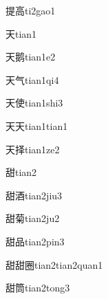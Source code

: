 \begin{verbete}[12;10]{提高}{ti2gao1}
\end{verbete}

\begin{verbete}[4]{天}{tian1}
\end{verbete}

\begin{verbete}[4;12]{天鹅}{tian1e2}
\end{verbete}

\begin{verbete}[4;4]{天气}{tian1qi4}
\end{verbete}

\begin{verbete}[4;8]{天使}{tian1shi3}
\end{verbete}

\begin{verbete}[4;4]{天天}{tian1tian1}
\end{verbete}

\begin{verbete}[4;8]{天择}{tian1ze2}
\end{verbete}

\begin{verbete}[11]{甜}{tian2}
\end{verbete}

\begin{verbete}[11;10]{甜酒}{tian2jiu3}
\end{verbete}

\begin{verbete}[11;11]{甜菊}{tian2ju2}
\end{verbete}

\begin{verbete}[11;9]{甜品}{tian2pin3}
\end{verbete}

\begin{verbete}[11;11;11]{甜甜圈}{tian2tian2quan1}
\end{verbete}

\begin{verbete}[11;12]{甜筒}{tian2tong3}
\end{verbete}

